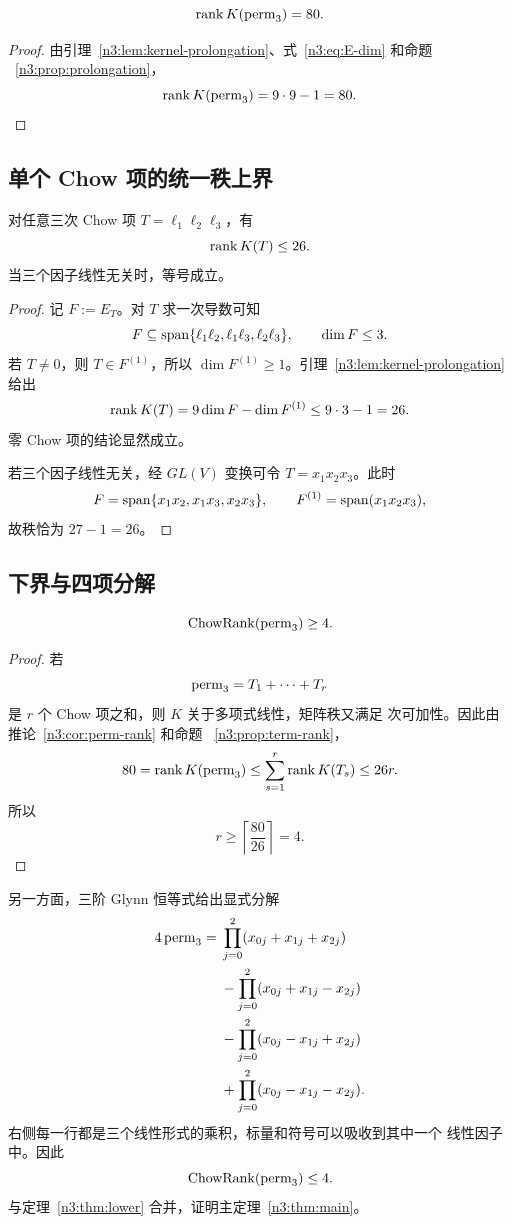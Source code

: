 \begin{corollary}\label{n3:cor:perm-rank}
\[
  \operatorname{rank} K(\operatorname{perm}_3)=80.
\]
\end{corollary}

\begin{proof}
由引理~\ref{n3:lem:kernel-prolongation}、式~\eqref{n3:eq:E-dim} 和命题
~\ref{n3:prop:prolongation}，
\[
  \operatorname{rank} K(\operatorname{perm}_3)
  =9\cdot9-1=80.
\]
\end{proof}

\subsection{单个 Chow 项的统一秩上界}

\begin{proposition}\label{n3:prop:term-rank}
对任意三次 Chow 项 \(T=\ell_1\ell_2\ell_3\)，有
\[
  \operatorname{rank} K(T)\leq26.
\]
当三个因子线性无关时，等号成立。
\end{proposition}

\begin{proof}
记 \(F:=E_T\)。对 \(T\) 求一次导数可知
\[
  F\subseteq
  \operatorname{span}\{\ell_1\ell_2,\ell_1\ell_3,\ell_2\ell_3\},
  \qquad \dim F\leq3.
\]
若 \(T\neq0\)，则 \(T\in F^{(1)}\)，所以
\(\dim F^{(1)}\geq1\)。引理~\ref{n3:lem:kernel-prolongation} 给出
\[
  \operatorname{rank} K(T)
  =9\dim F-\dim F^{(1)}
  \leq9\cdot3-1=26.
\]
零 Chow 项的结论显然成立。

若三个因子线性无关，经 \(GL(V)\) 变换可令
\(T=x_1x_2x_3\)。此时
\[
  F=\operatorname{span}\{x_1x_2,x_1x_3,x_2x_3\},
  \qquad F^{(1)}=\operatorname{span}(x_1x_2x_3),
\]
故秩恰为 \(27-1=26\)。
\end{proof}

\subsection{下界与四项分解}

\begin{theorem}\label{n3:thm:lower}
\[
  \operatorname{ChowRank}(\operatorname{perm}_3)\geq4.
\]
\end{theorem}

\begin{proof}
若
\[
  \operatorname{perm}_3=T_1+\cdots+T_r
\]
是 \(r\) 个 Chow 项之和，则 \(K\) 关于多项式线性，矩阵秩又满足
次可加性。因此由推论~\ref{n3:cor:perm-rank} 和命题
~\ref{n3:prop:term-rank}，
\[
  80=\operatorname{rank} K(\operatorname{perm}_3)
  \leq\sum_{s=1}^{r}\operatorname{rank} K(T_s)
  \leq26r.
\]
所以
\[
  r\geq\left\lceil\frac{80}{26}\right\rceil=4.
\]
\end{proof}

另一方面，三阶 Glynn 恒等式给出显式分解
\begin{align}\label{n3:eq:glynn}
4\operatorname{perm}_3={}&
\prod_{j=0}^{2}(x_{0j}+x_{1j}+x_{2j})\notag\\
&-\prod_{j=0}^{2}(x_{0j}+x_{1j}-x_{2j})\notag\\
&-\prod_{j=0}^{2}(x_{0j}-x_{1j}+x_{2j})\\
&+\prod_{j=0}^{2}(x_{0j}-x_{1j}-x_{2j}).\notag
\end{align}
右侧每一行都是三个线性形式的乘积，标量和符号可以吸收到其中一个
线性因子中。因此
\[
  \operatorname{ChowRank}(\operatorname{perm}_3)\leq4.
\]
与定理~\ref{n3:thm:lower} 合并，证明主定理~\ref{n3:thm:main}。

